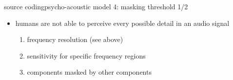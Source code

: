 	\begin{frame}{source coding}{psycho-acoustic model 4: masking threshold 1/2}
        \begin{itemize}
            \item   humans are not able to perceive every possible detail in an audio signal
                \begin{enumerate}[i]
                    \item<1->   frequency resolution (see above)
                    \item<1->   sensitivity for specific frequency regions
                    \item<2->   components masked by other components
\end{enumerate}
\end{itemize}
\end{frame}
